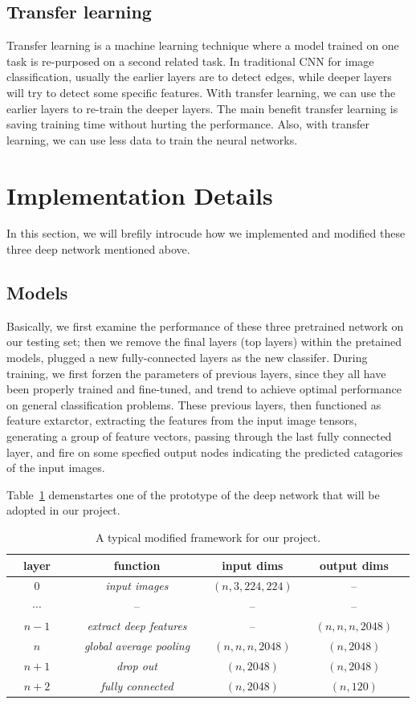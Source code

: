 \documentclass{article}
\begin{document}
\subsection{Transfer learning}

Transfer learning is a machine learning technique where a model trained on one task is re-purposed on a second related task. 
In traditional CNN for image classification, usually the earlier layers are to detect edges, while deeper layers will try to detect some specific features. 
With transfer learning, we can use the earlier layers to re-train the deeper layers. The main benefit transfer learning is saving training time without hurting the performance. Also, with transfer learning, we can use less data to train the neural networks. 

\section{Implementation Details}

In this section, we will brefily introcude how we implemented and modified these three deep network mentioned above. 
\subsection{Models}
Basically, we first examine the performance of these three pretrained network on our testing set; then we remove the final layers (top layers) within the pretained models, plugged a new fully-connected layers as the new classifer. 
During training, we first forzen the parameters of previous layers, since they all have been properly trained and fine-tuned, and trend to achieve optimal performance on general classification problems. 
These previous layers, then functioned as feature extarctor, extracting the features from the input image tensors, generating a group of feature vectors, passing through the last fully connected layer, and fire on some specfied output nodes indicating the predicted catagories of the input images. 

Table~\ref{tab:1} demenstartes one of the prototype of the deep network that will be adopted in our project. 

\begin{table}[h]
	\centering
	\caption{A typical modified framework for our project.}
	\label{tab:1}
	\begin{tabular}{ccc|ccccccc}
		\toprule
		& layer &&& function && input dims && output dims & \\ 
		\midrule
		& $0$ &&& \emph{input images} && $(n, 3, 224, 224)$ && -- & \\ 
		& $\cdots$ &&& -- && -- && -- & \\
		& $n-1$ &&& \emph{extract deep features} && -- && $(n, n, n, 2048)$  & \\ 
		\midrule
		& $n$ &&& \emph{global average pooling} && $(n,n,n, 2048)$ && $(n, 2048)$ & \\ 
		& $n+1$ &&& \emph{drop out} && $(n, 2048)$ && $(n, 2048)$ & \\ 
		& $n+2$ &&& \emph{fully connected} && $(n, 2048)$  && $(n, 120)$ & \\ 
		\bottomrule
	\end{tabular}
\end{table}
\end{document}
